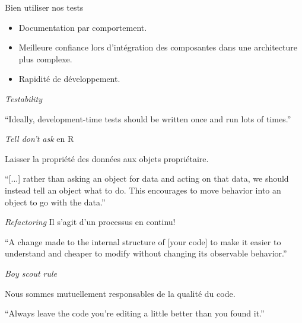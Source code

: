 \documentclass[11pt]{beamer}
\begin{document}
\begin{frame}{Bien utiliser nos tests}
\begin{itemize}
\item Documentation par comportement.
\item Meilleure confiance lors d'intégration des composantes dans une architecture plus complexe.
\item Rapidité de développement.
\end{itemize}
\end{frame}

\begin{frame}{\textit{Testability}}
\begin{block}{}
{\large ``Ideally, development-time tests should be written once and run lots of times.''}
\vskip5mm
\hspace*{}
\end{block}
\end{frame}

\begin{frame}{\textit{Tell don't ask} en R}

Laisser la propriété des données aux objets propriétaire.

\begin{block}{}
{\large ``[...] rather than asking an object for data and acting on that data, we should instead tell an object what to do. This encourages to move behavior into an object to go with the data.''}
\vskip5mm
\hspace*{}
\end{block}
\end{frame}

\begin{frame}{\textit{Refactoring}}
Il s'agit d'un processus en continu!
\begin{block}{}
{\large ``A change made to the internal structure of [your code] to make it easier to understand and cheaper to modify without changing its observable behavior.''}
\vskip5mm
\hspace*{}
\end{block}
\end{frame}

\begin{frame}{\textit{Boy scout rule}}

Nous sommes mutuellement responsables de la qualité du code.

\begin{block}{}
{\large ``Always leave the code you're editing a little better than you found it.''}
\vskip5mm
\hspace*{}
\end{block}
\end{frame}

\end{document}
